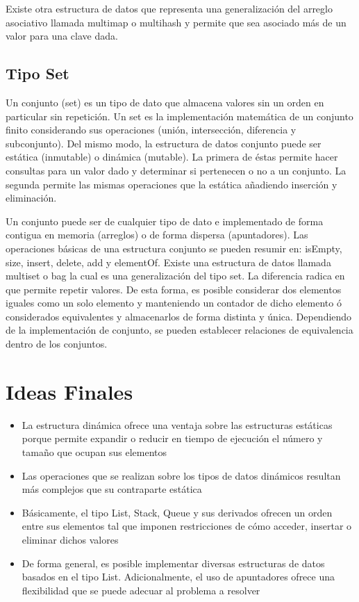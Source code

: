 Existe otra estructura de datos que representa una generalización del arreglo asociativo llamada multimap o multihash y permite que sea asociado más de un valor para una clave dada. 

\subsection{Tipo Set}

Un conjunto (set) es un tipo de dato que almacena valores sin un orden en particular sin repetición. Un set es la implementación matemática de un conjunto finito considerando sus operaciones (unión, intersección, diferencia y subconjunto). Del mismo modo, la estructura de datos conjunto puede ser estática (inmutable) o dinámica (mutable). La primera de éstas permite hacer consultas para un valor dado y determinar si pertenecen o no a un conjunto. La segunda permite las mismas operaciones que la estática añadiendo inserción y eliminación.

Un conjunto puede ser de cualquier tipo de dato e implementado de forma contigua en memoria (arreglos) o de forma dispersa (apuntadores). Las operaciones básicas de una estructura conjunto se pueden resumir en: isEmpty, size, insert, delete, add y elementOf.
Existe una estructura de datos llamada multiset o bag la cual es una generalización del tipo set. La diferencia radica en que permite repetir valores. De esta forma, es posible considerar dos elementos iguales como un solo elemento y manteniendo un contador de dicho elemento ó considerados equivalentes y almacenarlos de forma distinta y única. Dependiendo de la implementación de conjunto, se pueden establecer relaciones de equivalencia dentro de los conjuntos. 

\section{Ideas Finales}

\begin{itemize}
\item La estructura dinámica ofrece una ventaja sobre las estructuras estáticas porque permite expandir o reducir en tiempo de ejecución el número y tamaño que ocupan sus elementos
\item Las operaciones que se realizan sobre los tipos de datos dinámicos resultan más complejos que su contraparte estática
\item Básicamente, el tipo List, Stack, Queue y sus derivados ofrecen un orden entre sus elementos tal que imponen restricciones de cómo acceder, insertar o eliminar dichos valores
\item De forma general, es posible implementar diversas estructuras de datos basados en el tipo List. Adicionalmente, el uso de apuntadores ofrece una flexibilidad que se puede adecuar al problema a resolver
\end{itemize}

